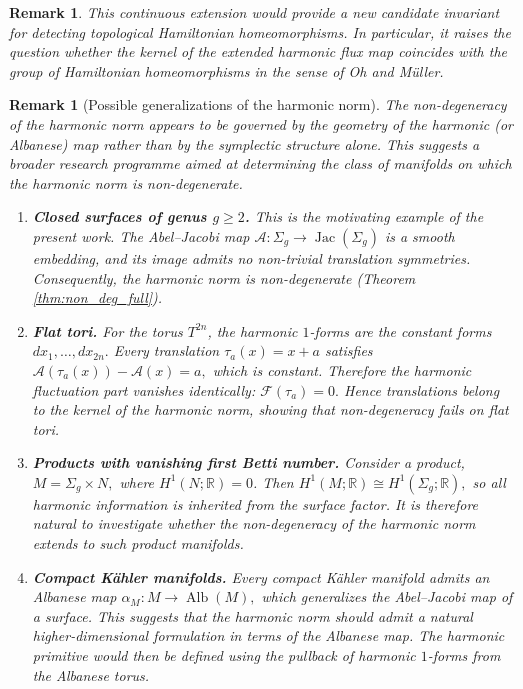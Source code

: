 \documentclass[11pt]{article}
\newtheorem{remark}[theorem]{Remark}
\theoremstyle{definition}
\begin{document}
	\begin{remark}
		This continuous extension would provide a new candidate invariant for detecting
		topological Hamiltonian homeomorphisms. In particular, it raises the question
		whether the kernel of the extended harmonic flux map coincides with the group of
		Hamiltonian homeomorphisms in the sense of Oh and M\"uller.
	\end{remark}
	
	\begin{remark}[Possible generalizations of the harmonic norm]
		\label{rem:generalizations}
		The non-degeneracy of the harmonic norm appears to be governed by the geometry
		of the harmonic (or Albanese) map rather than by the symplectic structure alone.
		This suggests a broader research programme aimed at determining the class of
		manifolds on which the harmonic norm is non-degenerate.
		
		\begin{enumerate}
			\item \textbf{Closed surfaces of genus $g\ge2$.}
			This is the motivating example of the present work. The Abel--Jacobi map
			$\mathcal A:\Sigma_g\longrightarrow \operatorname{Jac}(\Sigma_g)$ is a smooth
			embedding, and its image admits no non-trivial translation symmetries.
			Consequently, the harmonic norm is non-degenerate (Theorem
			\ref{thm:non_deg_full}).
			
			\item \textbf{Flat tori.}
			For the torus $T^{2n}$, the harmonic $1$-forms are the constant forms
			$dx_1,\ldots,dx_{2n}.$ Every translation $\tau_a(x)=x+a$ satisfies $\mathcal
			A(\tau_a(x))-\mathcal A(x)=a,$ which is constant. Therefore the harmonic
			fluctuation part vanishes identically: $\mathcal F(\tau_a)=0.$ Hence
			translations belong to the kernel of the harmonic norm, showing that
			non-degeneracy fails on flat tori.
			
			\item \textbf{Products with vanishing first Betti number.}
			Consider a product, $M=\Sigma_g\times N,$ where $H^1(N;\mathbb R)=0$. Then
			$H^1(M;\mathbb R)\cong H^1(\Sigma_g;\mathbb R),$ so all harmonic information is
			inherited from the surface factor. It is therefore natural to investigate
			whether the non-degeneracy of the harmonic norm extends to such product
			manifolds.
			
			\item \textbf{Compact K\"ahler manifolds.}
			Every compact K\"ahler manifold admits an Albanese map $\alpha_M:M\longrightarrow
			\operatorname{Alb}(M),$ which generalizes the Abel--Jacobi map of a surface.
			This suggests that the harmonic norm should admit a natural higher-dimensional
			formulation in terms of the Albanese map. The harmonic primitive would then be
			defined using the pullback of harmonic $1$-forms from the Albanese torus.
			

\end{enumerate}
\end{remark}
\end{document}
